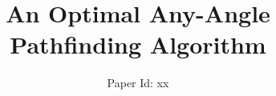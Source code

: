 \documentclass{article}
\begin{document}
\title{An Optimal Any-Angle Pathfinding Algorithm}
\author{Paper Id: xx}

\maketitle









\end{document}
